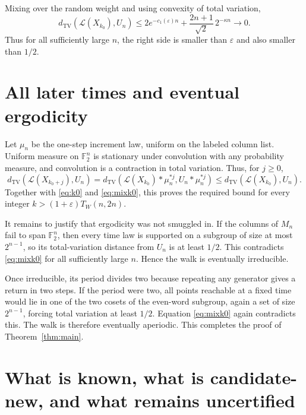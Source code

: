 \documentclass[11pt]{article}
\newcommand{\F}{\mathbb F}
\newcommand{\TV}{d_{\mathrm{TV}}}
\newcommand{\1}{\mathbf 1}
\begin{document}
Mixing over the random weight and using convexity of total variation,
\begin{equation}\label{eq:mixk0}
 \TV(\mathcal L(X_{k_0}),U_n)
 \le 2e^{-c_1(\varepsilon)n}
 +\frac{2n+1}{\sqrt2}\,2^{-\kappa n}
 \longrightarrow0.
\end{equation}
Thus for all sufficiently large $n$, the right side is smaller than $\varepsilon$ and also smaller than $1/2$.

\section{All later times and eventual ergodicity}

Let $\mu_n$ be the one-step increment law, uniform on the labeled column list.  Uniform measure on $\F_2^n$ is stationary under convolution with any probability measure, and convolution is a contraction in total variation.  Thus, for $j\ge0$,
\[
 \TV(\mathcal L(X_{k_0+j}),U_n)
 =\TV(\mathcal L(X_{k_0})*\mu_n^{*j},U_n*\mu_n^{*j})
 \le\TV(\mathcal L(X_{k_0}),U_n).
\]
Together with \eqref{eq:k0} and \eqref{eq:mixk0}, this proves the required bound for every integer
$k>(1+\varepsilon)T_W(n,2n)$.

It remains to justify that ergodicity was not smuggled in.  If the columns of $M_n$ fail to span $\F_2^n$, then every time law is supported on a subgroup of size at most $2^{n-1}$, so its total-variation distance from $U_n$ is at least $1/2$.  This contradicts \eqref{eq:mixk0} for all sufficiently large $n$.  Hence the walk is eventually irreducible.

Once irreducible, its period divides two because repeating any generator gives a return in two steps.  If the period were two, all points reachable at a fixed time would lie in one of the two cosets of the even-word subgroup, again a set of size $2^{n-1}$, forcing total variation at least $1/2$.  Equation \eqref{eq:mixk0} again contradicts this.  The walk is therefore eventually aperiodic.  This completes the proof of Theorem~\ref{thm:main}.

\section{What is known, what is candidate-new, and what remains uncertified}
\end{document}
